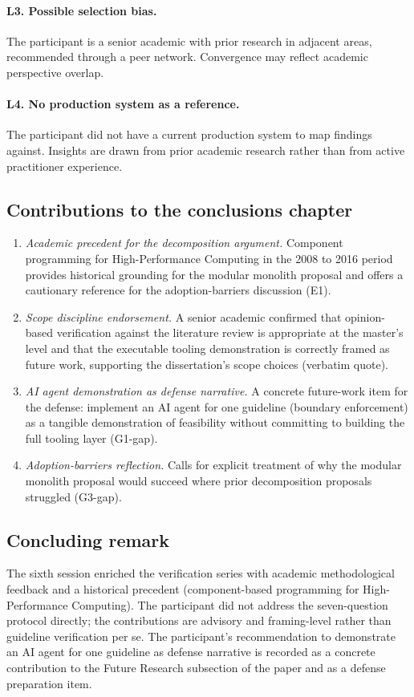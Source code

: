 \paragraph*{L3. Possible selection bias.} The participant is a senior academic with prior research in adjacent areas, recommended through a peer network. Convergence may reflect academic perspective overlap.

\paragraph*{L4. No production system as a reference.} The participant did not have a current production system to map findings against. Insights are drawn from prior academic research rather than from active practitioner experience.

\subsection*{Contributions to the conclusions chapter}

\begin{enumerate}[itemsep=3pt,topsep=2pt]
  \item \emph{Academic precedent for the decomposition argument.} Component programming for High-Performance Computing in the 2008 to 2016 period provides historical grounding for the modular monolith proposal and offers a cautionary reference for the adoption-barriers discussion (E1).
  \item \emph{Scope discipline endorsement.} A senior academic confirmed that opinion-based verification against the literature review is appropriate at the master's level and that the executable tooling demonstration is correctly framed as future work, supporting the dissertation's scope choices (verbatim quote).
  \item \emph{AI agent demonstration as defense narrative.} A concrete future-work item for the defense: implement an AI agent for one guideline (boundary enforcement) as a tangible demonstration of feasibility without committing to building the full tooling layer (G1-gap).
  \item \emph{Adoption-barriers reflection.} Calls for explicit treatment of why the modular monolith proposal would succeed where prior decomposition proposals struggled (G3-gap).
\end{enumerate}

\subsection*{Concluding remark}

The sixth session enriched the verification series with academic methodological feedback and a historical precedent (component-based programming for High-Performance Computing). The participant did not address the seven-question protocol directly; the contributions are advisory and framing-level rather than guideline verification per se. The participant's recommendation to demonstrate an AI agent for one guideline as defense narrative is recorded as a concrete contribution to the Future Research subsection of the paper and as a defense preparation item.
